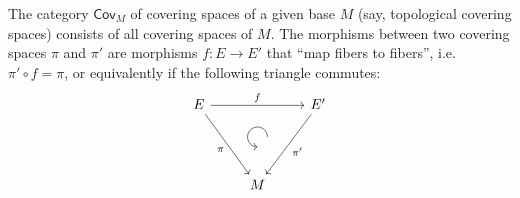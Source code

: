 \documentclass[english,letterpaper]{article}%
\numberwithin{equation}{section}
\numberwithin{figure}{section}
\numberwithin{table}{section}
\theoremstyle{definition}
\theoremstyle{definition}
\theoremstyle{definition}
\theoremstyle{plain}
\theoremstyle{plain}
\theoremstyle{plain}
\theoremstyle{plain}
\theoremstyle{remark}
\theoremstyle{remark}
\begin{document}
\begin{defn}
The category $\mathsf{Cov}_M$ of covering spaces of a given base $M$ (say, topological covering spaces) consists of all covering spaces of $M$. The morphisms between two covering spaces $\pi$ and $\pi'$ are morphisms $f:E\to E'$ that ``map fibers to fibers'', i.e.\ $\pi'\circ f=\pi$, or equivalently if the following triangle commutes:
\[
\begin{tikzcd}[every matrix/.append style={name=m},   
execute at end picture={\draw [<-] ([xshift=0mm,yshift=-2mm]m-2-2.north) arc[start angle=-90,delta angle=-270,radius=0.25cm];}]
   E \arrow[rr,"f"]\arrow[ddr,swap,"\pi"]& & E'\arrow[ddl,"\pi'"]\\
   & \, & \\
   & M & \\
\end{tikzcd}
\]
\end{defn}
\end{document}
